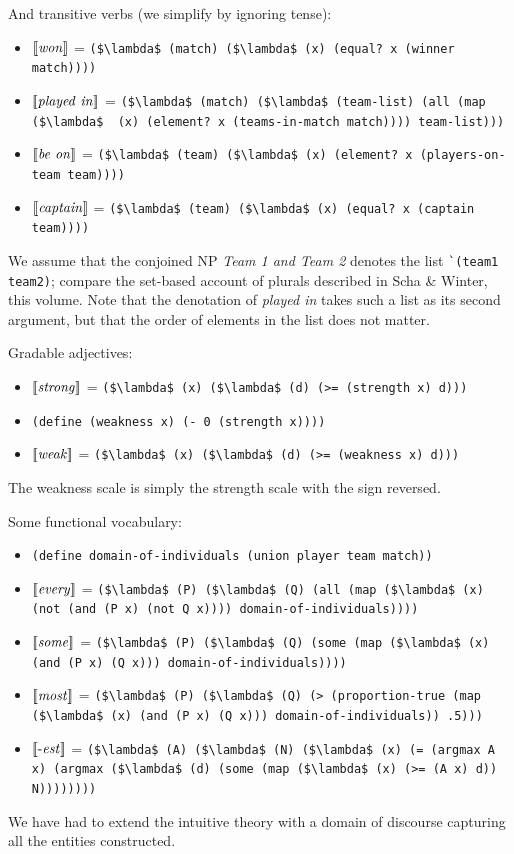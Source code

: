 \documentclass[pdfextras]{handbook}
\newcommand{\llbracket}{\ensuremath{\left [\!\left [}}%
\newcommand{\rrbracket}{\ensuremath{\right ]\!\right ]}}
\providecommand{\sv}[1]{\ensuremath{\llbracket \mathit{#1} \rrbracket}}
\begin{document}
And transitive verbs
(we simplify by ignoring tense):
\begin{itemize}
\item \sv{won} = \lstinline[mathescape]{($\lambda$ (match) ($\lambda$ (x) (equal? x (winner match))))}
\item \sv{played\ in} =  \lstinline[mathescape]{($\lambda$ (match) ($\lambda$ (team-list) (all (map ($\lambda$  (x) (element? x (teams-in-match match)))) team-list)))} 
\item \sv{be\ on} =  \lstinline[mathescape]{($\lambda$ (team) ($\lambda$ (x) (element? x (players-on-team team))))} 
\item \sv{captain} = \lstinline[mathescape]{($\lambda$ (team) ($\lambda$ (x) (equal? x (captain team))))}
\end{itemize}
We assume that the conjoined NP \emph{Team 1 and Team 2} denotes the list \lstinline{`(team1 team2)}; compare the set-based account of plurals described in Scha \& Winter, this volume.
Note that the denotation of \emph{played in} takes such a list as its second argument, but that the order of elements in the list does not matter.

Gradable adjectives:
\begin{itemize}
\item \sv{strong} = \lstinline[mathescape]{($\lambda$ (x) ($\lambda$ (d) (>= (strength x) d)))}
\item \lstinline{(define (weakness x) (- 0 (strength x))))}
\item \sv{weak} = \lstinline[mathescape]{($\lambda$ (x) ($\lambda$ (d) (>= (weakness x) d)))}
\end{itemize}
The weakness scale is simply the strength scale with the sign reversed.

Some functional vocabulary:
\begin{itemize}
\item \lstinline{(define domain-of-individuals (union player team match))}
\item \sv{every} = \lstinline[mathescape]{($\lambda$ (P) ($\lambda$ (Q) (all (map ($\lambda$ (x) (not (and (P x) (not Q x)))) domain-of-individuals))))}
\item \sv{some} = \lstinline[mathescape]{($\lambda$ (P) ($\lambda$ (Q) (some (map ($\lambda$ (x) (and (P x) (Q x))) domain-of-individuals))))}
\item \sv{most} = \lstinline[mathescape]{($\lambda$ (P) ($\lambda$ (Q) (> (proportion-true (map ($\lambda$ (x) (and (P x) (Q x))) domain-of-individuals)) .5)))}
\item \sv{\text{-}est} = \lstinline[mathescape]{($\lambda$ (A) ($\lambda$ (N) ($\lambda$ (x) (= (argmax A x) (argmax ($\lambda$ (d) (some (map ($\lambda$ (x) (>= (A x) d)) N))))))))}
\end{itemize}
We have had to extend the intuitive theory with a domain of discourse capturing all the entities constructed.
\end{document}
